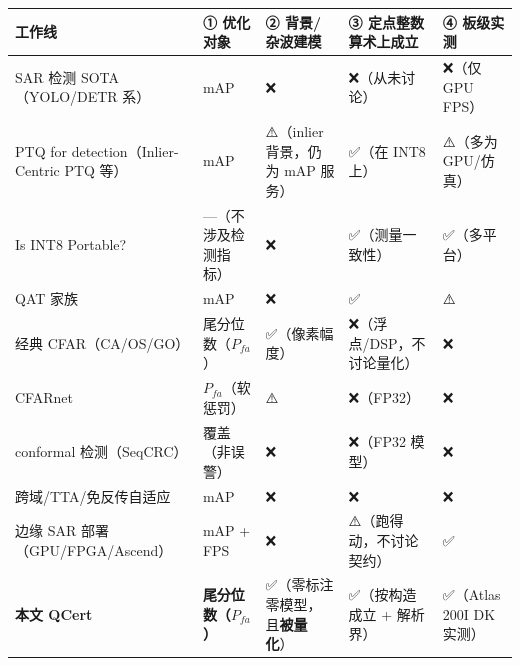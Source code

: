 {\def\LTcaptype{none} %
\begin{longtable}[]{@{}
  >{\raggedright\arraybackslash}p{}
  >{\raggedright\arraybackslash}p{}
  >{\raggedright\arraybackslash}p{}
  >{\raggedright\arraybackslash}p{}
  >{\raggedright\arraybackslash}p{}@{}}
\toprule\noalign{}
\begin{minipage}[b]{\linewidth}\raggedright
工作线
\end{minipage} & \begin{minipage}[b]{\linewidth}\raggedright
① 优化对象
\end{minipage} & \begin{minipage}[b]{\linewidth}\raggedright
② 背景/杂波建模
\end{minipage} & \begin{minipage}[b]{\linewidth}\raggedright
③ 定点整数算术上成立
\end{minipage} & \begin{minipage}[b]{\linewidth}\raggedright
④ 板级实测
\end{minipage} \\
\midrule\noalign{}
\endhead
\bottomrule\noalign{}
\endlastfoot
SAR 检测 SOTA（YOLO/DETR 系） & mAP & ❌ & ❌（从未讨论） & ❌（仅 GPU
FPS） \\
PTQ for detection（Inlier-Centric PTQ 等） & mAP & ⚠️（inlier 背景，仍为
mAP 服务） & ✅（在 INT8 上） & ⚠️（多为 GPU/仿真） \\
Is INT8 Portable? & ---（不涉及检测指标） & ❌ & ✅（测量一致性） &
✅（多平台） \\
QAT 家族 & mAP & ❌ & ✅ & ⚠️ \\
经典 CFAR（CA/OS/GO） & 尾分位数（\(P_{fa}\)） & ✅（像素幅度） &
❌（浮点/DSP，不讨论量化） & ❌ \\
CFARnet & \(P_{fa}\)（软惩罚） & ⚠️ & ❌（FP32） & ❌ \\
conformal 检测（SeqCRC） & 覆盖（非误警） & ❌ & ❌（FP32 模型） & ❌ \\
跨域/TTA/免反传自适应 & mAP & ❌ & ❌ & ❌ \\
边缘 SAR 部署（GPU/FPGA/Ascend） & mAP + FPS & ❌ &
⚠️（跑得动，不讨论契约） & ✅ \\
\textbf{本文 QCert} & \textbf{尾分位数（\(P_{fa}\)）} &
✅（零标注零模型，且\textbf{被量化}） & ✅（按构造成立 + 解析界） &
✅（Atlas 200I DK 实测） \\
\end{longtable}
}

